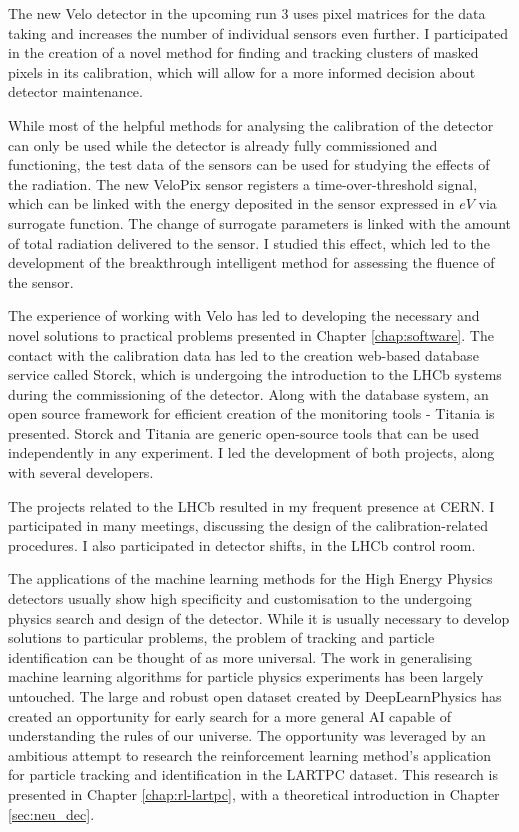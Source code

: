 The new Velo detector in the upcoming run 3 uses pixel matrices for the data taking and increases the number of individual sensors even further.
I participated in the creation of a novel method for finding and tracking clusters of masked pixels in its calibration, which will allow for a more informed decision about detector maintenance.

While most of the helpful methods for analysing the calibration of the detector can only be used while the detector is already fully commissioned and functioning, the test data of the sensors can be used for studying the effects of the radiation.
The new VeloPix sensor registers a time-over-threshold signal, which can be linked with the energy deposited in the sensor expressed in $eV$ via surrogate function. 
The change of surrogate parameters is linked with the amount of total radiation delivered to the sensor. I studied this effect, which led to the development of the breakthrough intelligent method for assessing the fluence of the sensor.

The experience of working with Velo has led to developing the necessary and novel solutions to practical problems presented in Chapter \ref{chap:software}.
The contact with the calibration data has led to the creation web-based database service called Storck, which is undergoing the introduction to the LHCb systems during the commissioning of the detector.
Along with the database system, an open source framework for efficient creation of the monitoring tools - Titania is presented.
Storck and Titania are generic open-source tools that can be used independently in any experiment.
I led the development of both  projects, along with several developers.

The projects related to the LHCb resulted in my frequent presence at CERN. 
I participated in many meetings, discussing the design of the calibration-related procedures.
I also participated in detector shifts, in the LHCb control room.

The applications of the machine learning methods for the High Energy Physics detectors usually show high specificity and customisation to the undergoing physics search and design of the detector.
While it is usually necessary to develop solutions to particular problems, the problem of tracking and particle identification can be thought of as more universal.
The work in generalising machine learning algorithms for particle physics experiments has been largely untouched.
The large and robust open dataset created by DeepLearnPhysics has created an opportunity for early search for a more general AI capable of understanding the rules of our universe.
The opportunity was leveraged by an ambitious attempt to research the reinforcement learning method's application for particle tracking and identification in the LARTPC dataset.
This research is presented in Chapter \ref{chap:rl-lartpc}, with a theoretical introduction in Chapter \ref{sec:neu_dec}.

